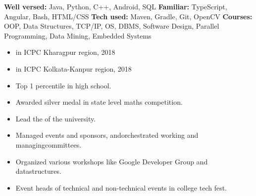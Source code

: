 \textbf{Well versed:} Java, Python, C++, Android, SQL\newline
\textbf{Familiar:} TypeScript, Angular, Bash, HTML/CSS\newline
\textbf{Tech used:} Maven, Gradle, Git, OpenCV\newline
\textbf{Courses:} OOP, Data Structures, TCP/IP, OS, DBMS, Software Design, Parallel
Programming, Data Mining, Embedded Systems


\begin{itemize}
    \item {}in ICPC Kharagpur region, 2018
    \item {}in ICPC Kolkata-Kanpur region, 2018
 \end{itemize}
 \begin{itemize}
    \item Top 1 percentile in high school.
    \item Awarded silver medal in state level maths competition.
 \end{itemize}



\begin{itemize}
    \item Lead the of the university.
    \item Managed events and sponsors, and\newline orchestrated working and managing\newline committees.
    \item Organized various workshops like Google Developer Group and datastructures.
 \end{itemize}
\begin{itemize}
    \item Event heads of technical and non-technical events in college tech fest.
 \end{itemize}


